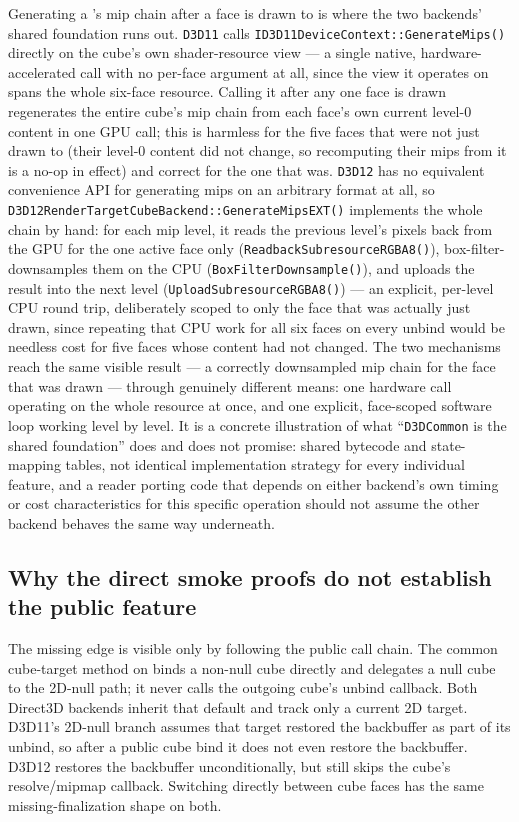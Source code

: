 Generating a 's mip chain after a face is drawn to is where the two
backends' shared foundation runs out. \texttt{D3D11} calls
\texttt{ID3D11DeviceContext::GenerateMips()} directly on the cube's own shader-resource view ---
a single native, hardware-accelerated call with no per-face argument at all, since the view it
operates on spans the whole six-face resource. Calling it after any one face is drawn
regenerates the entire cube's mip chain from each face's own current level-0 content in one GPU
call; this is harmless for the five faces that were not just drawn to (their level-0 content did
not change, so recomputing their mips from it is a no-op in effect) and correct for the one that
was. \texttt{D3D12} has no equivalent convenience API for generating mips on an arbitrary format
at all, so \texttt{D3D12RenderTargetCubeBackend::GenerateMipsEXT()} implements the whole chain by
hand: for each mip level, it reads the previous level's pixels back from the GPU for the one
active face only (\texttt{ReadbackSubresourceRGBA8()}), box-filter-downsamples them on the CPU
(\texttt{BoxFilterDownsample()}), and uploads the result into the next level
(\texttt{UploadSubresourceRGBA8()}) --- an explicit, per-level CPU round trip, deliberately scoped
to only the face that was actually just drawn, since repeating that CPU work for all six faces on
every unbind would be needless cost for five faces whose content had not changed. The two
mechanisms reach the same visible result --- a correctly downsampled mip chain for the face that
was drawn --- through genuinely different means: one hardware call operating on the whole
resource at once, and one explicit, face-scoped software loop working level by level. It is a
concrete illustration of what ``\texttt{D3DCommon} is the shared foundation'' does and does not
promise: shared bytecode and state-mapping tables, not identical implementation strategy for
every individual feature, and a reader porting code that depends on either backend's own timing
or cost characteristics for this specific operation should not assume the other backend behaves
the same way underneath.

\subsection{Why the direct smoke proofs do not establish the public feature}

The missing edge is visible only by following the public call chain. The common cube-target
method on  binds a non-null cube directly and delegates a null cube
to the 2D-null path; it never calls the outgoing cube's unbind callback. Both Direct3D
backends inherit that default and track only a current 2D target. D3D11's 2D-null branch
assumes that target restored the backbuffer as part of its unbind, so after a public cube bind
it does not even restore the backbuffer. D3D12 restores the backbuffer unconditionally, but
still skips the cube's resolve/mipmap callback. Switching directly between cube faces has the
same missing-finalization shape on both.


